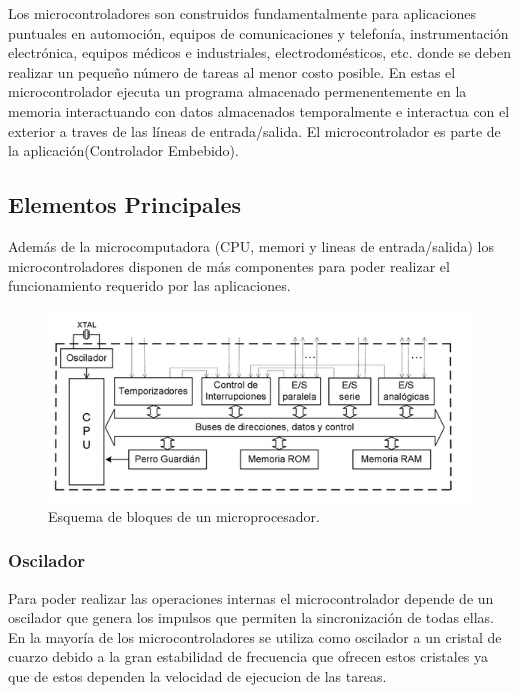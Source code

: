 \documentclass[letterpaper,12pt,oneside]{book}
\begin{document}
		Los microcontroladores son construidos fundamentalmente para aplicaciones puntuales en automoción, equipos de comunicaciones y telefonía, instrumentación electrónica, equipos médicos e industriales, electrodomésticos, etc. donde se deben realizar un pequeño número de tareas al menor costo posible. En estas el microcontrolador ejecuta un programa almacenado permenentemente en la memoria interactuando con datos almacenados temporalmente e interactua con el exterior a traves de las líneas de entrada/salida. El microcontrolador es parte de la aplicación(Controlador Embebido).

			\subsection{Elementos Principales}
			Además de la microcomputadora (CPU, memori y lineas de entrada/salida) los microcontroladores disponen de más componentes para poder realizar el funcionamiento requerido por las aplicaciones.

			\begin{figure}[!htpb]
				\centering
				\includegraphics[scale = 1.0]{Material de Consulta/BloqMicro.PNG}
				\caption[Esquema de bloques de un microprocesador]{Esquema de bloques de un microprocesador.}
				\label{BloqMicro}
			\end{figure}

				\subsubsection{Oscilador}
				Para poder realizar las operaciones internas el microcontrolador depende de un oscilador que genera los impulsos que permiten la sincronización de todas ellas. En la mayoría de los microcontroladores se utiliza como oscilador a un cristal de cuarzo debido a la gran estabilidad de frecuencia que ofrecen estos cristales ya que de estos dependen la velocidad de ejecucion de las tareas.
\end{document}
